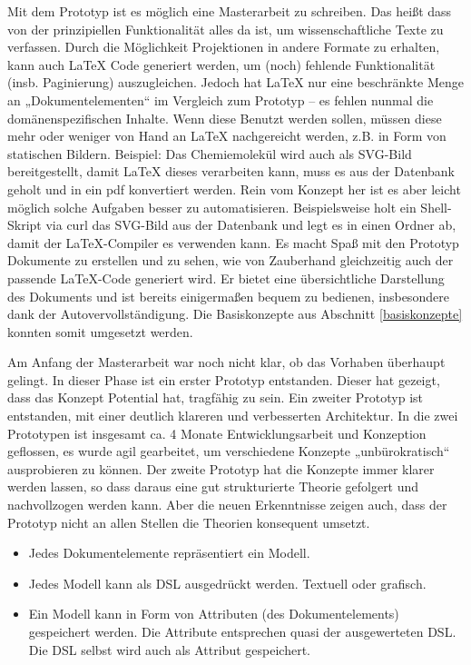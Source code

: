 Mit dem Prototyp ist es möglich eine Masterarbeit zu schreiben. Das heißt dass von der prinzipiellen Funktionalität alles da ist, um wissenschaftliche Texte zu verfassen. Durch die Möglichkeit Projektionen in andere Formate zu erhalten, kann auch LaTeX Code generiert werden, um (noch) fehlende Funktionalität (insb. Paginierung) auszugleichen. Jedoch hat LaTeX nur eine beschränkte Menge an „Dokumentelementen“ im Vergleich zum Prototyp -- es fehlen nunmal die domänenspezifischen Inhalte. Wenn diese Benutzt werden sollen, müssen diese mehr oder weniger von Hand an LaTeX nachgereicht werden, z.B. in Form von statischen Bildern. Beispiel: Das Chemiemolekül wird auch als SVG-Bild bereitgestellt, damit LaTeX dieses verarbeiten kann, muss es aus der Datenbank geholt und in ein pdf konvertiert werden. Rein vom Konzept her ist es aber leicht möglich solche Aufgaben besser zu automatisieren. Beispielsweise holt ein Shell-Skript via curl das SVG-Bild aus der Datenbank und legt es in einen Ordner ab, damit der LaTeX-Compiler es verwenden kann. Es macht Spaß mit den Prototyp Dokumente zu erstellen und zu sehen, wie von Zauberhand gleichzeitig auch der passende LaTeX-Code generiert wird. Er bietet eine übersichtliche Darstellung des Dokuments und ist bereits einigermaßen bequem zu bedienen, insbesondere dank der Autovervollständigung. Die Basiskonzepte aus Abschnitt \ref{basiskonzepte} konnten somit umgesetzt werden.

 
Am Anfang der Masterarbeit war noch nicht klar, ob das Vorhaben überhaupt gelingt. In dieser Phase ist ein erster Prototyp entstanden. Dieser hat gezeigt, dass das Konzept Potential hat, tragfähig zu sein. Ein zweiter Prototyp ist entstanden, mit einer deutlich klareren und verbesserten Architektur. In die zwei Prototypen ist insgesamt ca. 4 Monate Entwicklungsarbeit und Konzeption geflossen, es wurde agil gearbeitet, um verschiedene Konzepte „unbürokratisch“ ausprobieren zu können. Der zweite Prototyp hat die Konzepte immer klarer werden lassen, so dass daraus eine gut strukturierte Theorie gefolgert und nachvollzogen werden kann. Aber die neuen Erkenntnisse zeigen auch, dass der Prototyp nicht an allen Stellen die Theorien konsequent umsetzt.

 
\begin{itemize}

\item Jedes Dokumentelemente repräsentiert ein Modell.
\item Jedes Modell kann als DSL ausgedrückt werden. Textuell oder grafisch.
\item Ein Modell kann in Form von Attributen (des Dokumentelements) gespeichert werden. Die Attribute entsprechen quasi der ausgewerteten DSL. Die DSL selbst wird auch als Attribut gespeichert.
\end{itemize}
 
